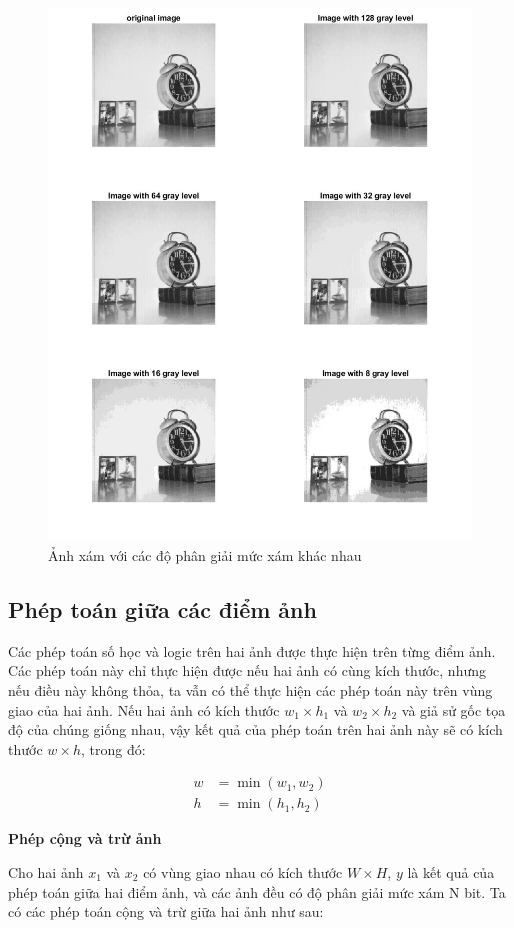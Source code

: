 \begin{figure}[H]
    \centering
    \includegraphics[width=.75\linewidth]{images/gray_scale_resolution.jpg}
    \caption{Ảnh xám với các độ phân giải mức xám khác nhau}
    \label{fig:gray_scale_resolution}
\end{figure}

\subsection{Phép toán giữa các điểm ảnh}

Các phép toán số học và logic trên hai ảnh được thực hiện trên từng điểm ảnh.
Các phép toán này chỉ thực hiện được nếu hai ảnh có cùng kích thước, nhưng nếu điều này không thỏa, ta vẫn có thể thực hiện các phép toán này trên vùng giao của hai ảnh. Nếu hai ảnh có kích thước $w_1 \times h_1$ và $w_2 \times h_2$ và giả sử gốc tọa độ của chúng giống nhau, vậy kết quả của phép toán trên hai ảnh này sẽ có kích thước $w \times h$, trong đó:

\begin{align}
    w &= \min (w_1, w_2) \\
    h &= \min (h_1, h_2)
\end{align}

\textbf{Phép cộng và trừ ảnh}

Cho hai ảnh $x_1$ và $x_2$ có vùng giao nhau có kích thước $W \times H$, $y$ là kết quả của phép toán giữa hai điểm ảnh, và các ảnh đều có độ phân giải mức xám N bit. Ta có các phép toán cộng và trừ giữa hai ảnh như sau:

